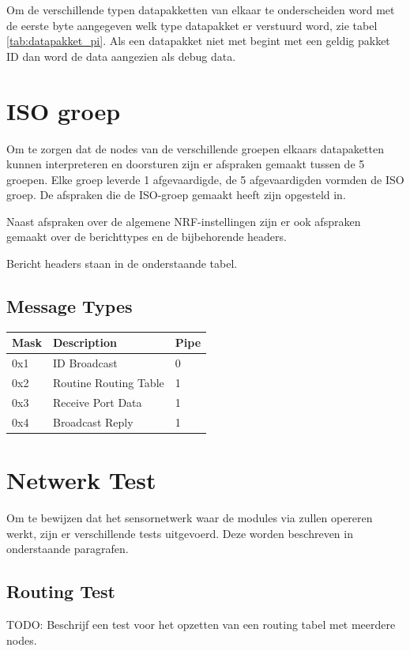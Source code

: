 \documentclass[a4paper, 11pt]{article}
\begin{document}
Om de verschillende typen datapakketten van elkaar te onderscheiden word met de eerste byte aangegeven welk type datapakket er verstuurd word, zie tabel \ref{tab:datapakket_pi}. Als een datapakket niet met begint met een geldig pakket ID dan word de data aangezien als debug data. 

\section{ISO groep}
Om te zorgen dat de nodes van de verschillende groepen elkaars datapaketten kunnen interpreteren en doorsturen zijn er afspraken gemaakt tussen de 5 groepen. Elke groep leverde 1 afgevaardigde, de 5 afgevaardigden vormden de ISO groep. De afspraken die de ISO-groep gemaakt heeft zijn opgesteld in\cite{ISO}.

Naast afspraken over de algemene NRF-instellingen zijn er ook afspraken gemaakt over de berichttypes en de bijbehorende headers.

Bericht headers staan in de onderstaande tabel.

\subsection*{Message Types}
\begin{table}[!ht]
\begin{tabular}{|l|l|l|}
\hline
\rowcolor[HTML]{EFEFEF}
Mask & Description           & Pipe \\ \hline
0x1  & ID Broadcast          & 0    \\ \hline
0x2  & Routine Routing Table & 1    \\ \hline
0x3  & Receive Port Data     & 1    \\ \hline
0x4  & Broadcast Reply       & 1    \\ \hline
\end{tabular}
\end{table}

\section{Netwerk Test}
Om te bewijzen dat het sensornetwerk waar de modules via zullen opereren werkt, zijn er verschillende tests uitgevoerd. Deze worden beschreven in onderstaande paragrafen.
\subsection{Routing Test}
TODO: Beschrijf een test voor het opzetten van een routing tabel met meerdere nodes.
\end{document}
